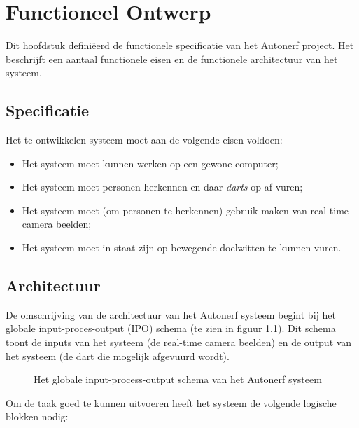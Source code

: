 \chapter{Functioneel Ontwerp}
\label{ch:functional}

Dit hoofdstuk definiëerd de functionele specificatie van het Autonerf project.
Het beschrijft een aantaal functionele eisen en de functionele architectuur
van het systeem.

\section{Specificatie}

Het te ontwikkelen systeem moet aan de volgende eisen voldoen:

\begin{itemize}
    \item Het systeem moet kunnen werken op een gewone computer;
    \item Het systeem moet personen herkennen en daar \emph{darts} op af vuren;
    \item Het systeem moet (om personen te herkennen) gebruik maken van
        real-time camera beelden;
    \item Het systeem moet in staat zijn op bewegende doelwitten te kunnen vuren.
\end{itemize}

\section{Architectuur}
\label{sec:func:arch}

De omschrijving van de architectuur van het Autonerf systeem begint bij het
globale input-proces-output (IPO) schema (te zien in figuur \ref{fig:global-ipo}).
Dit schema toont de inputs van het systeem (de real-time camera beelden) en de
output van het systeem (de dart die mogelijk afgevuurd wordt).

\begin{figure}[H]
    \begin{center}
        
    \end{center}
    \caption{Het globale input-process-output schema van het Autonerf systeem}
    \label{fig:global-ipo}
\end{figure}

\vfill
\pagebreak

Om de taak goed te kunnen uitvoeren heeft het systeem de volgende logische
blokken nodig:

